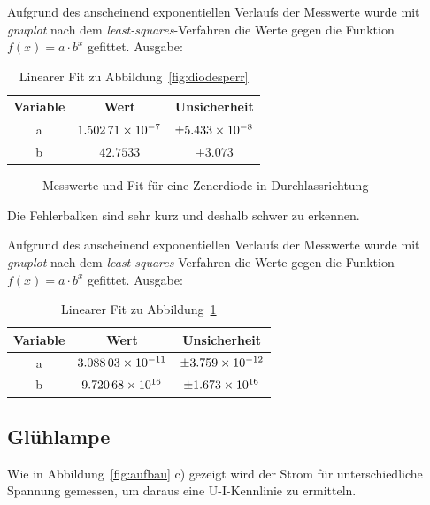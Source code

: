 Aufgrund des anscheinend exponentiellen Verlaufs der Messwerte wurde mit \emph{gnuplot} nach dem \emph{least-squares}-Verfahren die Werte gegen die Funktion $f(x)=a\cdot b^x$ gefittet. Ausgabe:
\begin{table}[H]
  \centering
  \begin{tabular}{c | c | c }
    Variable & Wert & Unsicherheit\\ \hline
    a & $\num{1.50271d-7}$ & $\pm\num{5.433d-8}$ \\
    b & $\num{42.7533}$ & $\pm\num{3.073}$
  \end{tabular}
  \caption{Linearer Fit zu Abbildung~\ref{fig:diodesperr}}
  \label{tab:fitdiodesperr}
\end{table}
\begin{figure}[H]
\centering
{}
\caption{Messwerte und Fit für eine Zenerdiode in Durchlassrichtung}
\label{fig:diodedurch}
\end{figure}
Die Fehlerbalken sind sehr kurz und deshalb schwer zu erkennen.

Aufgrund des anscheinend exponentiellen Verlaufs der Messwerte wurde mit \emph{gnuplot} nach dem \emph{least-squares}-Verfahren die Werte gegen die Funktion $f(x)=a\cdot b^x$ gefittet. Ausgabe:
\begin{table}[H]
  \centering
  \begin{tabular}{c | c | c }
    Variable & Wert & Unsicherheit\\ \hline
    a & $\num{3.08803d-11}$ & $\pm\num{3.759d-12}$ \\
    b & $\num{9,72068d16}$ & $\pm\num{1.673d16}$
  \end{tabular}
  \caption{Linearer Fit zu Abbildung~\ref{fig:diodedurch}}
  \label{tab:fitdiodedurch}
\end{table}
\subsection{Glühlampe}
Wie in Abbildung~\ref{fig:aufbau} c) gezeigt wird der Strom für unterschiedliche Spannung gemessen, um daraus eine U-I-Kennlinie zu ermitteln.

